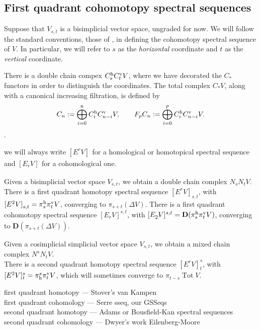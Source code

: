 \documentclass[11pt]{amsart}
\theoremstyle{plain}
\theoremstyle{definition}
\DeclareMathOperator{\Tot}{Tot}
\theoremstyle{plain}
\newcommand{\E}[5]{[E^{#1}_{#2}#3]^{#4}_{#5}}
\newcommand{\uver}{^\textup{v}}
\newcommand{\uhor}{^\textup{h}}
\newcommand{\dhor}{_\textup{h}}
\newcommand{\diag}{\Delta}
\newcommand{\dual}{\mathbf{D}}
\begin{document}
\begin{Conventions and notation}
\subsection{First quadrant cohomotopy spectral sequences}
Suppose that $V_{s,t}$ is a bisimplicial vector space, ungraded for now. We will follow the standard conventions, those of \cite{MR2245560}, in defining the cohomotopy spectral sequence of $V$. In particular, we will refer to $s$ as the \emph{horizontal} coordinate and $t$ as the \emph{vertical} coordinate.

There is a double chain compex $C\uhor_sC\uver_tV$, where we have decorated the $C_*$ functors in order to distinguish the coordinates. The total complex $C_*V$, along with a canonical increasing filtration, is defined by 
\[C_n:=\bigoplus_{i=0}^{n}C\uhor_iC\uver_{n-i}V,\qquad F_pC_n:=\bigoplus_{i=0}^{p}C\uhor_iC\uver_{n-i}V.\]
.



we will always write $\E{r}{}{V}{}{}$ for a homological or homotopical spectral sequence and $\E{}{r}{V}{}{}$ for a cohomological one.

Given a bisimplicial vector space $V_{s,t}$, we obtain a double chain complex $N_sN_tV$. There is a first quadrant homotopy spectral sequence $\E{r}{}{V}{}{s,t}$, with $\E{2}{}{V}{}{s,t}=\pi\uhor_s\pi\uver_tV$, converging to $\pi_{s+t}(\diag V)$.
There is a first quadrant cohomotopy spectral sequence $\E{}{r}{V}{s,t}{}$, with $\E{}{2}{V}{s,t}{}=\dual(\pi\uhor_s\pi\uver_tV)$, converging to $\dual(\pi_{s+t}(\diag V))$.

Given a cosimplicial simplicial vector space  $V_{s,t}$, we obtain a mixed chain complex $N^sN_tV$.\\
There is a second quadrant homotopy spectral sequence $\E{r}{}{V}{s}{t}$, with $\E{2}{}{V}{s}{t}=\pi\dhor^s\pi\uver_tV$, which will sometimes converge to $\pi_{t-s}\Tot V$.

\hfil

\noindent first quadrant homotopy --- Stover's van Kampen\\
first quadrant cohomology --- Serre sseq, our GSSeqs\\
second quadrant homotopy --- Adams or Bousfield-Kan spectral sequences\\
second quadrant cohomology --- Dwyer's work Eilenberg-Moore









\end{Conventions and notation}
\end{document}
